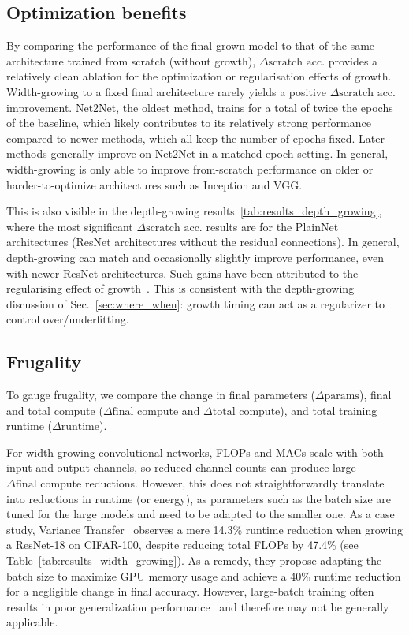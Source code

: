 \subsection{Optimization benefits}
By comparing the performance of the final grown model to that of the same architecture trained from scratch (without growth), $\Delta\textrm{scratch acc.}$ provides a relatively clean ablation for the optimization or regularisation effects of growth. Width-growing to a fixed final architecture rarely yields a positive $\Delta\textrm{scratch acc.}$ improvement. Net2Net, the oldest method, trains for a total of twice the epochs of the baseline, which likely contributes to its relatively strong performance compared to newer methods, which all keep the number of epochs fixed. Later methods generally improve on Net2Net in a matched-epoch setting. In general, width-growing is only able to improve from-scratch performance on older or harder-to-optimize architectures such as Inception and VGG.

This is also visible in the depth-growing results~\autoref{tab:results_depth_growing}, where the most significant $\Delta\textrm{scratch acc.}$ results are for the PlainNet architectures (ResNet architectures without the residual connections).
In general, depth-growing can match and occasionally slightly improve performance, even with newer ResNet architectures. Such gains have been attributed to the regularising effect of growth~\cite{wu_when_2024}. This is consistent with the depth-growing discussion of Sec.~\ref{sec:where_when}: growth timing can act as a regularizer to control over/underfitting.

\subsection{Frugality}
To gauge frugality, we compare the change in final parameters ($\Delta\textrm{params}$), final and total compute ($\Delta\textrm{final compute}$ and $\Delta\textrm{total compute}$), and total training runtime ($\Delta\textrm{runtime}$). 

For width-growing convolutional networks, FLOPs and MACs scale with both input and output channels, so reduced channel counts can produce large $\Delta\textrm{final compute}$ reductions. However, this does not straightforwardly translate into reductions in runtime (or energy), as parameters such as the batch size are tuned for the large models and need to be adapted to the smaller one. As a case study, Variance Transfer~\citep{yuan_accelerated_2023} observes a mere 14.3\% runtime reduction when growing a ResNet-18 on CIFAR-100, despite reducing total FLOPs by 47.4\% (see Table~\ref{tab:results_width_growing}). As a remedy, they propose adapting the batch size to maximize GPU memory usage and achieve a 40\% runtime reduction for a negligible change in final accuracy. However, large-batch training often results in poor generalization performance~\citep{keskar_large-batch_2017} and therefore may not be generally applicable.

